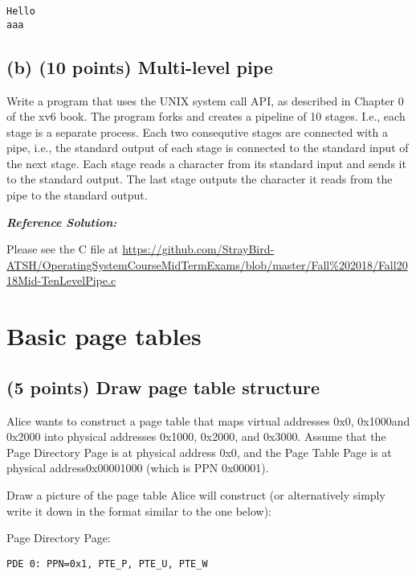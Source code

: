 \documentclass[]{article}
\begin{document}
\begin{verbatim}
Hello
aaa
\end{verbatim}

\hypertarget{b-10-points-multi-level-pipe}{%
\subsection{(b) (10 points) Multi-level
pipe}\label{b-10-points-multi-level-pipe}}

Write a program that uses the UNIX system call API, as described in
Chapter 0 of the xv6 book. The program forks and creates a pipeline of
10 stages. I.e., each stage is a separate process. Each two consequtive
stages are connected with a pipe, i.e., the standard output of each
stage is connected to the standard input of the next stage. Each stage
reads a character from its standard input and sends it to the standard
output. The last stage outputs the character it reads from the pipe to
the standard output.

\textbf{\emph{Reference Solution:}}

Please see the C file at
\url{https://github.com/StrayBird-ATSH/OperatingSystemCourseMidTermExams/blob/master/Fall\%202018/Fall2018Mid-TenLevelPipe.c}

\hypertarget{basic-page-tables}{%
\section{Basic page tables}\label{basic-page-tables}}

\hypertarget{points-draw-page-table-structure}{%
\subsection{(5 points) Draw page table
structure}\label{points-draw-page-table-structure}}

Alice wants to construct a page table that maps virtual addresses 0x0,
0x1000and 0x2000 into physical addresses 0x1000, 0x2000, and 0x3000.
Assume that the Page Directory Page is at physical address 0x0, and the
Page Table Page is at physical address0x00001000 (which is PPN 0x00001).

Draw a picture of the page table Alice will construct (or alternatively
simply write it down in the format similar to the one below):

Page Directory Page:

\texttt{PDE\ 0:\ PPN=0x1,\ PTE\_P,\ PTE\_U,\ PTE\_W}
\end{document}
